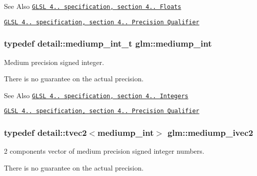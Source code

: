 \begin{DoxySeeAlso}{See Also}
\href{http://www.opengl.org/registry/doc/GLSLangSpec.4.20.8.pdf}{\tt G\-L\-S\-L 4.. specification, section 4.. Floats} 

\href{http://www.opengl.org/registry/doc/GLSLangSpec.4.20.8.pdf}{\tt G\-L\-S\-L 4.. specification, section 4.. Precision Qualifier} 
\end{DoxySeeAlso}
\hypertarget{group__core__precision_ga2a3dcbcd7f4e17663d393a12061ac6ac}{
\subsubsection[{mediump\-\_\-int}]{\setlength{\rightskip}{0pt plus 5cm}typedef detail\-::mediump\-\_\-int\-\_\-t {\bf glm\-::mediump\-\_\-int}}}\label{group__core__precision_ga2a3dcbcd7f4e17663d393a12061ac6ac}


Medium precision signed integer. 

There is no guarantee on the actual precision.

\begin{DoxySeeAlso}{See Also}
\href{http://www.opengl.org/registry/doc/GLSLangSpec.4.20.8.pdf}{\tt G\-L\-S\-L 4.. specification, section 4.. Integers} 

\href{http://www.opengl.org/registry/doc/GLSLangSpec.4.20.8.pdf}{\tt G\-L\-S\-L 4.. specification, section 4.. Precision Qualifier} 
\end{DoxySeeAlso}
\hypertarget{group__core__precision_ga4803c44369a1aea2e7e51397c341ce6f}{
\subsubsection[{mediump\-\_\-ivec2}]{\setlength{\rightskip}{0pt plus 5cm}typedef detail\-::tvec2$<$mediump\-\_\-int$>$ {\bf glm\-::mediump\-\_\-ivec2}}}\label{group__core__precision_ga4803c44369a1aea2e7e51397c341ce6f}


2 components vector of medium precision signed integer numbers. 

There is no guarantee on the actual precision.

